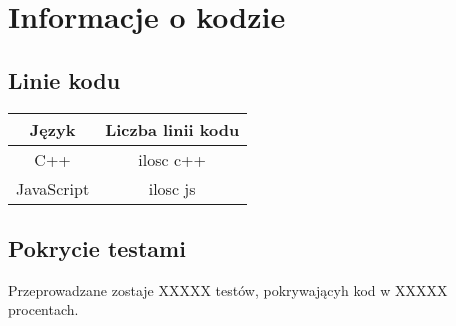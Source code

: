 \chapter{Informacje o kodzie}
\section{Linie kodu}
\begin{table}[h]
\begin{tabular}{|c|c|}
\hline
Język & Liczba linii kodu \\ \hline
C++ & ilosc c++ \\ \hline
JavaScript & ilosc js \\ \hline
\end{tabular}
\end{table}

\section{Pokrycie testami}
Przeprowadzane zostaje XXXXX testów, pokrywającyh kod w XXXXX procentach.